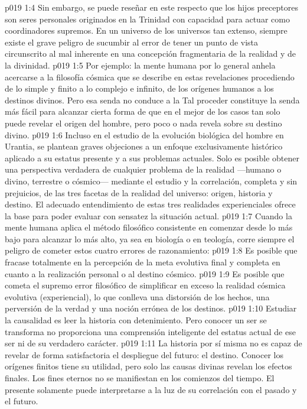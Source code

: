 \vs p019 1:4 Sin embargo, se puede reseñar en este respecto que los hijos preceptores son seres personales originados en la Trinidad con capacidad para actuar como coordinadores supremos. En un universo de los universos tan extenso, siempre existe el grave peligro de sucumbir al error de tener un punto de vista circunscrito al mal inherente en una concepción fragmentaria de la realidad y de la divinidad.
\vs p019 1:5 Por ejemplo: la mente humana por lo general anhela acercarse a la filosofía cósmica que se describe en estas revelaciones procediendo de lo simple y finito a lo complejo e infinito, de los orígenes humanos a los destinos divinos. Pero esa senda no conduce a la  Tal proceder constituye la senda más fácil para alcanzar cierta forma de  que en el mejor de los casos tan solo puede revelar el origen del hombre, pero poco o nada revela sobre su destino divino.
\vs p019 1:6 Incluso en el estudio de la evolución biológica del hombre en Urantia, se plantean graves objeciones a un enfoque exclusivamente histórico aplicado a su estatus presente y a sus problemas actuales. Solo es posible obtener una perspectiva verdadera de cualquier problema de la realidad ---humano o divino, terrestre o cósmico--- mediante el estudio y la correlación, completa y sin prejuicios, de las tres facetas de la realidad del universo: origen, historia y destino. El adecuado entendimiento de estas tres realidades experienciales ofrece la base para poder evaluar con sensatez la situación actual.
\vs p019 1:7 \pc Cuando la mente humana aplica el método filosófico consistente en comenzar desde lo más bajo para alcanzar lo más alto, ya sea en biología o en teología, corre siempre el peligro de cometer estos cuatro errores de razonamiento:
\vs p019 1:8 Es posible que fracase totalmente en la percepción de la meta evolutiva final y completa en cuanto a la realización personal o al destino cósmico.
\vs p019 1:9 Es posible que cometa el supremo error filosófico de simplificar en exceso la realidad cósmica evolutiva (experiencial), lo que conlleva una distorsión de los hechos, una perversión de la verdad y una noción errónea de los destinos.
\vs p019 1:10 Estudiar la causalidad es leer la historia con detenimiento. Pero conocer  un ser se transforma no proporciona una comprensión inteligente del estatus actual de ese ser ni de su verdadero carácter.
\vs p019 1:11 La historia por sí misma no es capaz de revelar de forma satisfactoria el despliegue del futuro: el destino. Conocer los orígenes finitos tiene su utilidad, pero solo las causas divinas revelan los efectos finales. Los fines eternos no se manifiestan en los comienzos del tiempo. El presente solamente puede interpretarse a la luz de su correlación con el pasado y el futuro.
